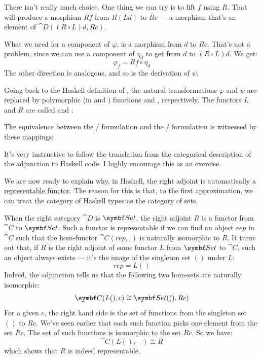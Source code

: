 There isn't really much choice. One thing we can try is to lift
$f$ using $R$. That will produce a morphism $R f$
from $R (L d)$ to $R c$ --- a morphism that's an
element of $\cat{D}((R \circ L) d, R c)$.

What we need for a component of $\varphi$, is a morphism from
$d$ to $R c$. That's not a problem, since we can use a
component of $\eta_d$ to get from $d$ to
$(R \circ L) d$. We get:
\[\varphi_f = R f \circ \eta_d\]
The other direction is analogous, and so is the derivation of $\psi$.

Going back to the Haskell definition of , the natural
transformations $\varphi$ and $\psi$ are replaced by polymorphic
(in  and ) functions  and
, respectively. The functors $L$ and
$R$ are called  and :

The equivalence between the / formulation
and the /\allowbreak{} formulation is
witnessed by these mappings:

It's very instructive to follow the translation from the categorical
description of the adjunction to Haskell code. I highly encourage this
as an exercise.

We are now ready to explain why, in Haskell, the right adjoint is
automatically a \hyperref[representable-functors]{representable
  functor}. The reason for this is that, to the first approximation, we
can treat the category of Haskell types as the category of sets.

When the right category $\cat{D}$ is $\Set$, the right adjoint
$R$ is a functor from $\cat{C}$ to $\Set$. Such a functor is
representable if we can find an object $\mathit{rep}$ in $\cat{C}$ such
that the hom-functor $\cat{C}(\mathit{rep}, \_)$ is naturally isomorphic to
$R$. It turns out that, if $R$ is the right adjoint of
some functor $L$ from $\Set$ to $\cat{C}$, such an object
always exists --- it's the image of the singleton set $()$ under
$L$:
\[\mathit{rep} = L ()\]
Indeed, the adjunction tells us that the following two hom-sets are
naturally isomorphic:
\[\cat{C}(L (), c) \cong \Set((), R c)\]
For a given $c$, the right hand side is the set of functions from
the singleton set $()$ to $R c$. We've seen earlier that
each such function picks one element from the set $R c$. The set
of such functions is isomorphic to the set $R c$. So we have:
\[\cat{C}(L (), -) \cong R\]
which shows that $R$ is indeed representable.

